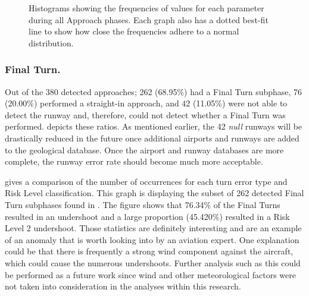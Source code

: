     \begin{figure}
    	\centering
        \hfill%
        
        \hfill%
        \caption{Histograms showing the frequencies of values for each parameter during all Approach phases.  Each graph also has a dotted best-fit line to show how close the frequencies adhere to a normal distribution.}
        \label{fig:approach_histograms}
    \end{figure}
    
    
        \subsubsection{Final Turn.}
        
        	Out of the 380 detected approaches; 262 (68.95\%) had a Final Turn subphase, 76 (20.00\%) performed a straight-in approach, and 42 (11.05\%) were not able to detect the runway and, therefore, could not detect whether a Final Turn was performed.   depicts these ratios.  As mentioned earlier, the 42 \textit{null} runways will be drastically reduced in the future once additional airports and runways are added to the geological database.  Once the airport and runway databases are more complete, the runway error rate should become much more acceptable.
            
             gives a comparison of the number of occurrences for each turn error type and Risk Level classification.  This graph is displaying the subset of 262 detected Final Turn subphases found in .  The figure shows that 76.34\% of the Final Turns resulted in an undershoot and a large proportion (45.420\%) resulted in a Risk Level 2 undershoot.  Those statistics are definitely interesting and are an example of an anomaly that is worth looking into by an aviation expert.  One explanation could be that there is frequently a strong wind component against the aircraft, which could cause the numerous undershoots.  Further analysis such as this could be performed as a future work since wind and other meteorological factors were not taken into consideration in the analyses within this research.
            
